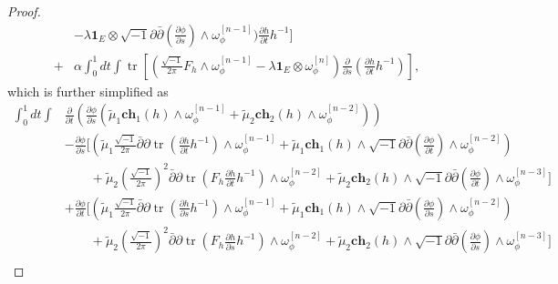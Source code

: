 \documentclass[10pt, letterpaper]{amsart}
\newcommand{\tr}{\operatorname{tr}}
\theoremstyle{plain}
\theoremstyle{definition}
\numberwithin{equation}{section}
\begin{document}
\begin{proof}
\begin{equation}
\begin{split}
   & -
    \lambda \mathbf{1}_E\otimes \sqrt{-1}\partial\bar\partial\left(\frac{\partial\phi}{\partial s}\right)\wedge\omega_\phi^{[n-1]}\Bigg)\frac{\partial h}{\partial t}h^{-1}
    \Bigg]\\
     + 
    &\alpha\int_0^1 dt\int 
     \tr
    \left[ 
    \left(
    \frac{\sqrt{-1}}{2\pi}F_h\wedge \omega_\phi^{[n-1]}
    - 
    \lambda \mathbf{1}_E \otimes \omega_\phi^{[n]}\right)\frac{\partial}{\partial s}\left( \frac{\partial h}{\partial t}h^{-1}\right)
    \right],
    \end{split}
    \end{equation}
which is further simplified as
    \begin{equation}
    \begin{split}
    \int_0^1 dt \int 
    & \frac{\partial}{\partial t}\left(\frac{\partial \phi}{\partial s}\left( 
    \widetilde\mu_1 \mathbf{ch}_1\left(h\right)\wedge \omega_\phi^{[n-1]} 
    + 
    \widetilde\mu_2 \mathbf{ch}_2\left(h\right)\wedge \omega_\phi^{[n-2]}\right)\right)\\
    &- 
    \frac{\partial \phi}{\partial s}
    \Bigg[ \left( \widetilde\mu_1 \frac{\sqrt{-1}}{2\pi}\bar\partial \partial \tr \left(\frac{\partial h}{\partial t}h^{-1}\right)\wedge \omega_\phi^{[n-1]} 
    + 
    \widetilde\mu_1 \mathbf{ch}_1\left(h\right)\wedge \sqrt{-1}\partial\bar\partial\left(\frac{\partial \phi}{\partial t}\right)\wedge \omega_\phi^{[n-2]}\right)\\
    & \qquad + 
    \widetilde\mu_2 \left(\frac{\sqrt{-1}}{2\pi}\right)^2\bar\partial \partial \tr \left( F_h\frac{\partial h}{\partial t}h^{-1}\right)\wedge\omega_\phi^{[n-2]}
    + 
    \widetilde\mu_2 \mathbf{ch}_2\left(h\right)\wedge \sqrt{-1}\partial\bar\partial \left(\frac{\partial \phi}{\partial t}\right)\wedge \omega_\phi^{[n-3]}\Bigg]\\
    &+ 
    \frac{\partial \phi}{\partial t}
    \Bigg[ \left( \widetilde\mu_1 \frac{\sqrt{-1}}{2\pi}\bar\partial \partial \tr \left(\frac{\partial h}{\partial s}h^{-1}\right)\wedge \omega_\phi^{[n-1]} 
    + 
    \widetilde\mu_1 \mathbf{ch}_1\left(h\right)\wedge \sqrt{-1}\partial\bar\partial\left(\frac{\partial \phi}{\partial s}\right)\wedge \omega_\phi^{[n-2]}\right)\\
    & \qquad + 
    \widetilde\mu_2 \left(\frac{\sqrt{-1}}{2\pi}\right)^2\bar\partial \partial \tr \left( F_h\frac{\partial h}{\partial s}h^{-1}\right)\wedge\omega_\phi^{[n-2]}
    + 
    \widetilde\mu_2 \mathbf{ch}_2\left(h\right)\wedge \sqrt{-1}\partial\bar\partial \left(\frac{\partial \phi}{\partial s}\right)\wedge \omega_\phi^{[n-3]}\Bigg]\\

\end{split}
\end{equation}
\end{proof}
\end{document}
